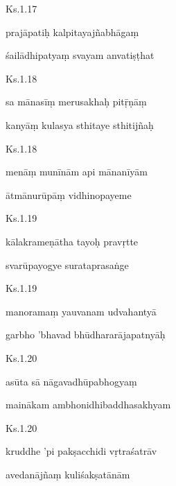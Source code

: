 \documentclass{tufte-handout}
\newenvironment{sanskrit}%
{\begin{otherlanguage}{sanskrit-devanagari}}%
{\end{otherlanguage}}
\begin{document}
    
	\begin{sanskrit}
	
	    
		Ks.1.17 
    
	    
		prajāpatiḥ kalpitayajñabhāgaṃ 
    
	    
		śailādhipatyaṃ svayam anvatiṣṭhat 
    
	\end{sanskrit}

    
	\begin{sanskrit}
	
	    
		Ks.1.18 
    
	    
		sa mānasīṃ merusakhaḥ pitṝṇāṃ 
    
	    
		kanyāṃ kulasya sthitaye sthitijñaḥ 
    
	\end{sanskrit}

    
	\begin{sanskrit}
	
	    
		Ks.1.18 
    
	    
		menāṃ munīnām api mānanīyām 
    
	    
		ātmānurūpāṃ vidhinopayeme 
    
	\end{sanskrit}

    
	\begin{sanskrit}
	
	    
		Ks.1.19 
    
	    
		kālakrameṇātha tayoḥ pravṛtte 
    
	    
		svarūpayogye surataprasaṅge 
    
	\end{sanskrit}

    
	\begin{sanskrit}
	
	    
		Ks.1.19 
    
	    
		manoramaṃ yauvanam udvahantyā 
    
	    
		garbho 'bhavad bhūdhararājapatnyāḥ 
    
	\end{sanskrit}

    
	\begin{sanskrit}
	
	    
		Ks.1.20 
    
	    
		asūta sā nāgavadhūpabhogyaṃ 
    
	    
		mainākam ambhonidhibaddhasakhyam 
    
	\end{sanskrit}

    
	\begin{sanskrit}
	
	    
		Ks.1.20 
    
	    
		kruddhe 'pi pakṣacchidi vṛtraśatrāv 
    
	    
		avedanājñaṃ kuliśakṣatānām 
    
	\end{sanskrit}
\end{document}

